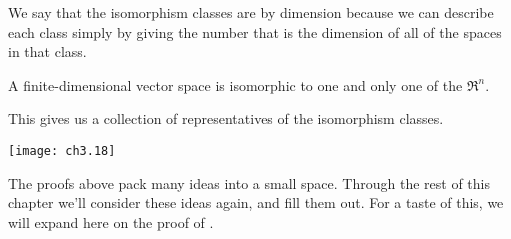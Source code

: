 We say that the isomorphism classes are 
%
by dimension because we can
describe each class simply by giving the number that is the dimension of
all of the spaces in that class.
 
\begin{corollary}
A finite-dimensional vector space is isomorphic to one and only one
of the $\Re^n$.
\end{corollary}

This gives us a collection of 
representatives of the isomorphism 
classes. %
\begin{center}
  \texttt{[image: ch3.18]}
\end{center}

The proofs above pack many ideas into a small space.
Through the rest of this chapter
we'll consider these ideas again, and fill them out.
For a taste of this, we will expand here 
on the proof of .

